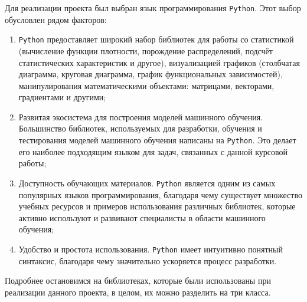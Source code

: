 \documentclass[14pt, russian]{scrartcl}
\begin{document}
Для реализации проекта был выбран язык программирования \verb|Python|\cite{python}. Этот выбор обусловлен рядом факторов:
\begin{enumerate} 
    \item \verb|Python| предоставляет широкий набор библиотек для работы со статистикой (вычисление функции плотности, порождение распределений, подсчёт статистических характеристик и другое), визуализацией графиков (столбчатая диаграмма, круговая диаграмма, график функциональных зависимостей), манипулирования математическими объектами: матрицами, векторами, градиентами и другими; 
    \item Развитая экосистема для построения моделей машинного обучения. Большинство библиотек, используемых для разработки, обучения и тестирования моделей машинного обучения написаны на \verb|Python|. Это делает его наиболее подходящим языком для задач, связанных с данной курсовой работы;
    \item Доступность обучающих материалов. \verb|Python| является одним из самых популярных языков программирования, благодаря чему существует множество учебных ресурсов и примеров использования различных библиотек, которые активно используют и развивают специалисты в области машинного обучения;
    \item Удобство и простота использования. \verb|Python| имеет интуитивно понятный синтаксис, благодаря чему значительно ускоряется процесс разработки.
\end{enumerate}

Подробнее остановимся на библиотеках, которые были использованы при реализации данного проекта, в целом, их можно разделить на три класса.
\end{document}
